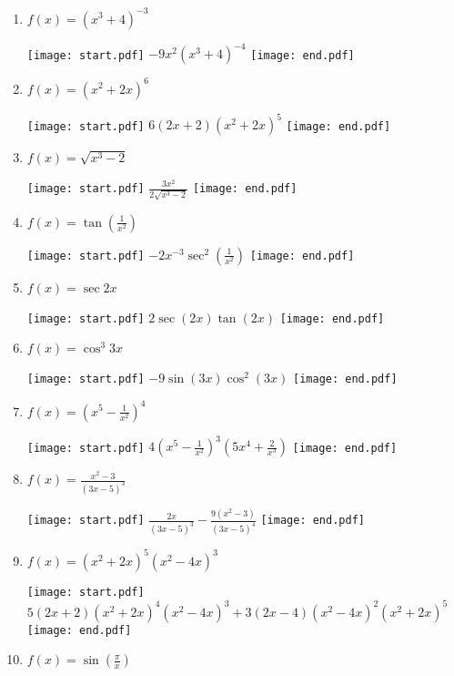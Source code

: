 \documentclass[12pt]{article}
\begin{document}
\begin{enumerate}

\item $f(x) = (x^3+4)^{-3}$ 

\texttt{[image: start.pdf]}
{{$-9x^2(x^3+4)^{-4}$}}
\texttt{[image: end.pdf]}


\item $f(x) = (x^2+2x)^6$ 

\texttt{[image: start.pdf]}
{{$6(2x+2)(x^2+2x)^5$}}
\texttt{[image: end.pdf]}


\item $f(x) = \sqrt{x^3-2}$ 

\texttt{[image: start.pdf]}
{{$\frac{3x^2}{2\sqrt{x^3-2}}$}}
\texttt{[image: end.pdf]}


\item $f(x) = \tan{\left(\frac{1}{x^2}\right)}$ 

\texttt{[image: start.pdf]}
{{$-2x^{-3}\sec^2{\left(\frac{1}{x^2}\right)}$}}
\texttt{[image: end.pdf]}


\item $f(x) = \sec{2x}$ 

\texttt{[image: start.pdf]}
{{$2\sec{(2x)}\tan{(2x)}$}}
\texttt{[image: end.pdf]}


\item $f(x) = \cos^3{3x}$ 

\texttt{[image: start.pdf]}
{{$-9\sin{(3x)}\cos^2{(3x)}$}}
\texttt{[image: end.pdf]}


\item $f(x) = \left(x^5-\frac{1}{x^2}\right)^4$ 

\texttt{[image: start.pdf]}
{{$4\left(x^5-\frac{1}{x^2}\right)^3\left(5x^4+\frac{2}{x^3}\right)$}}
\texttt{[image: end.pdf]}


\item $f(x) = \frac{x^2-3}{(3x-5)^3}$ 

\texttt{[image: start.pdf]}
{{$\frac{2x}{(3x-5)^3}-\frac{9(x^2-3)}{(3x-5)^4}$}}
\texttt{[image: end.pdf]}


\item $f(x) = (x^2+2x)^5(x^2-4x)^3$ 

\texttt{[image: start.pdf]}
{{$5(2x+2)(x^2+2x)^4(x^2-4x)^3+3(2x-4)(x^2-4x)^2(x^2+2x)^5$}}
\texttt{[image: end.pdf]}


\item $f(x) = \sin {\left(\frac{\pi}{x}\right)}$ 


\end{enumerate}
\end{document}
